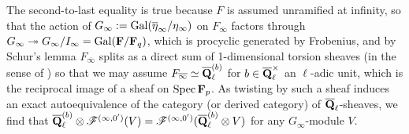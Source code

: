 \documentclass[deligne.tex]{subfiles}
\begin{document}
The second-to-last equality is true because $F$ is assumed unramified at
infinity, so that the action of
$G_\infty:=\operatorname{Gal}(\overline\eta_{\infty}/\eta_{\infty})$
on $F_{\overline\infty}$ factors through
$G_\infty\twoheadrightarrow G_\infty/I_\infty=\operatorname{Gal}(\mathbf{F}/\mathbf{F}_q)$, which is
procyclic generated by Frobenius, and by Schur's lemma
$F_{\overline\infty}$ splits as a direct sum of 1-dimensional torsion
sheaves (in the sense of \cite[1.2.7]{weilii}) so that we may assume
$F_{\overline\infty}\simeq\overline{\mathbf{Q}}_\ell^{(b)}$ for 
$b\in\overline{\mathbf{Q}}_\ell^\times$ an $\ell$-adic unit, which is the reciprocal
image of a sheaf on $\operatorname{Spec}\mathbf{F}_p$. As twisting by such a sheaf induces an
exact autoequivalence of the category (or derived category) of
$\overline{\mathbf{Q}}_\ell$-sheaves, we find that
$\overline{\mathbf{Q}}_\ell^{(b)}\otimes\mathscr F^{(\infty,0')}(V)=\mathscr F^{(\infty,0')}(\overline{\mathbf{Q}}_\ell^{(b)}\otimes V)$
for any $G_\infty$-module $V$.
\end{document}
